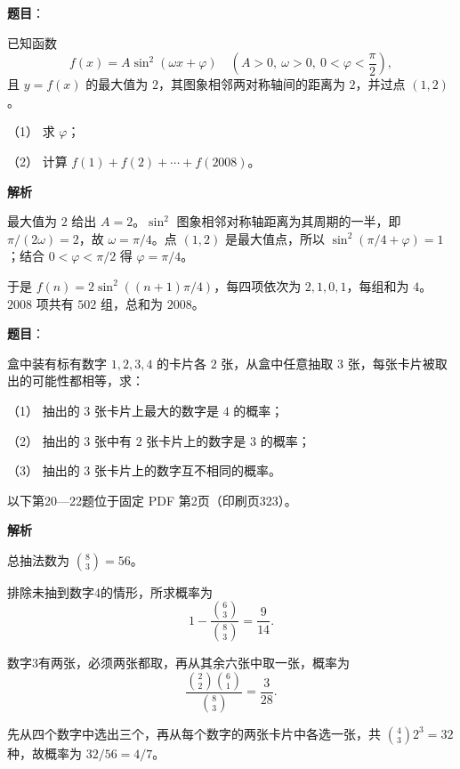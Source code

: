 \begin{answer}

\textbf{题目}：

已知函数
\nopagebreak[4]
\[
f(x)=A\sin^2(\omega x+\varphi)\quad
\left(A>0,\ \omega>0,\ 0<\varphi<\dfrac{\pi}{2}\right),
\]
且 $y=f(x)$ 的最大值为 $2$，其图象相邻两对称轴间的距离为 $2$，并过点 $(1,2)$。

（1） 求 $\varphi$；

（2） 计算 $f(1)+f(2)+\cdots+f(2008)$。

\textbf{解析}


最大值为 $2$ 给出 $A=2$。$\sin^2$ 图象相邻对称轴距离为其周期的一半，即 $\pi/(2\omega)=2$，故 $\omega=\pi/4$。点 $(1,2)$ 是最大值点，所以 $\sin^2(\pi/4+\varphi)=1$；结合 $0<\varphi<\pi/2$ 得 $\varphi=\pi/4$。


于是 $f(n)=2\sin^2((n+1)\pi/4)$，每四项依次为 $2,1,0,1$，每组和为 $4$。$2008$ 项共有 $502$ 组，总和为 $2008$。



\end{answer}
\begin{answer}

\textbf{题目}：

盒中装有标有数字 $1,2,3,4$ 的卡片各 $2$ 张，从盒中任意抽取 $3$ 张，每张卡片被取出的可能性都相等，求：

（1） 抽出的 $3$ 张卡片上最大的数字是 $4$ 的概率；

（2） 抽出的 $3$ 张中有 $2$ 张卡片上的数字是 $3$ 的概率；

（3） 抽出的 $3$ 张卡片上的数字互不相同的概率。

\begin{gktip}
以下第20—22题位于固定 PDF 第2页（印刷页323）。
\end{gktip}

\textbf{解析}

总抽法数为 $\binom83=56$。


排除未抽到数字4的情形，所求概率为
\nopagebreak[4]
\[
1-\frac{\binom63}{\binom83}=\frac9{14}.
\]


数字3有两张，必须两张都取，再从其余六张中取一张，概率为
\nopagebreak[4]
\[
\frac{\binom22\binom61}{\binom83}=\frac3{28}.
\]


先从四个数字中选出三个，再从每个数字的两张卡片中各选一张，共 $\binom43 2^3=32$ 种，故概率为 $32/56=4/7$。




\end{answer}
